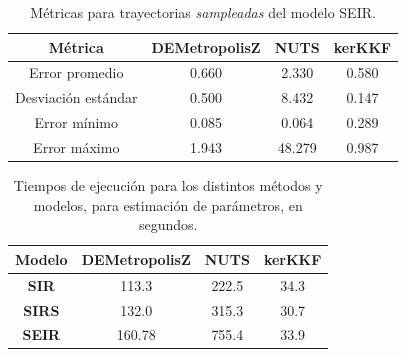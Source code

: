 \begin{table}[h!]
    \centering
    \begin{tabular}{|c|c|c|c|}
\hline
\textbf{Métrica} & \textbf{DEMetropolisZ} & \textbf{NUTS} & \textbf{kerKKF} \\
\hline
Error promedio & 0.660 & 2.330 & 0.580 \\
\hline
Desviación estándar & 0.500 & 8.432 & 0.147 \\
\hline
Error mínimo & 0.085 & 0.064 & 0.289 \\
\hline
Error máximo & 1.943 & 48.279 & 0.987 \\
\hline
\end{tabular}
    \caption{Métricas para trayectorias \textit{sampleadas} del modelo SEIR.}
    \label{tab:metricas_traj_SEIR}
\end{table}


\begin{table}[h!]
    \centering
    \caption{Tiempos de ejecución para los distintos métodos y modelos, para estimación de parámetros, en segundos.} 
    \begin{tabular}{|c|c|c|c|}
    \hline
    \textbf{Modelo} & \textbf{DEMetropolisZ} & \textbf{NUTS} & \textbf{kerKKF}  \\ \hline
    \textbf{SIR} & 113.3 & 222.5 & 34.3 \\ \hline
    \textbf{SIRS} & 132.0 & 315.3 & 30.7 \\ \hline
    \textbf{SEIR} & 160.78 & 755.4 & 33.9 \\ \hline
    \end{tabular}
    \label{tab:ex_times}
\end{table}